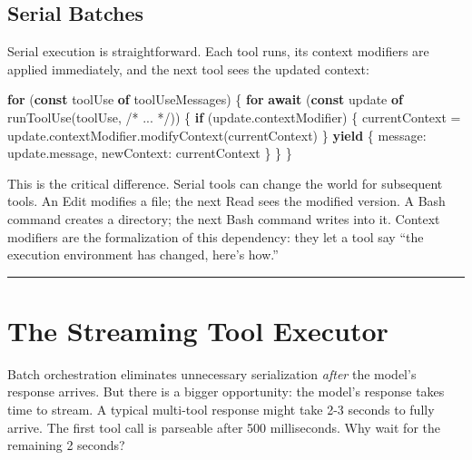 \documentclass[
  english,
  11pt,
  letterpaper,
]{book}
\newenvironment{Shaded}{\begin{snugshade}}{\end{snugshade}}
\newcommand{\AttributeTok}[1]{\textcolor[rgb]{0.40,0.45,0.13}{#1}}
\newcommand{\CommentTok}[1]{\textcolor[rgb]{0.37,0.37,0.37}{#1}}
\newcommand{\ControlFlowTok}[1]{\textcolor[rgb]{0.00,0.23,0.31}{\textbf{#1}}}
\newcommand{\FunctionTok}[1]{\textcolor[rgb]{0.28,0.35,0.67}{#1}}
\newcommand{\KeywordTok}[1]{\textcolor[rgb]{0.00,0.23,0.31}{\textbf{#1}}}
\newcommand{\NormalTok}[1]{\textcolor[rgb]{0.00,0.23,0.31}{#1}}
\newcommand{\OperatorTok}[1]{\textcolor[rgb]{0.37,0.37,0.37}{#1}}
\begin{document}
\subsection{Serial Batches}\label{serial-batches}

Serial execution is straightforward. Each tool runs, its context
modifiers are applied immediately, and the next tool sees the updated
context:

\begin{Shaded}
\begin{Highlighting}[]
\ControlFlowTok{for}\NormalTok{ (}\KeywordTok{const}\NormalTok{ toolUse }\KeywordTok{of}\NormalTok{ toolUseMessages) \{}
  \ControlFlowTok{for} \ControlFlowTok{await}\NormalTok{ (}\KeywordTok{const}\NormalTok{ update }\KeywordTok{of} \FunctionTok{runToolUse}\NormalTok{(toolUse}\OperatorTok{,} \CommentTok{/* ... */}\NormalTok{)) \{}
    \ControlFlowTok{if}\NormalTok{ (update}\OperatorTok{.}\AttributeTok{contextModifier}\NormalTok{) \{}
\NormalTok{      currentContext }\OperatorTok{=}\NormalTok{ update}\OperatorTok{.}\AttributeTok{contextModifier}\OperatorTok{.}\FunctionTok{modifyContext}\NormalTok{(currentContext)}
\NormalTok{    \}}
    \KeywordTok{yield}\NormalTok{ \{ message}\OperatorTok{:}\NormalTok{ update}\OperatorTok{.}\AttributeTok{message}\OperatorTok{,}\NormalTok{ newContext}\OperatorTok{:}\NormalTok{ currentContext \}}
\NormalTok{  \}}
\NormalTok{\}}
\end{Highlighting}
\end{Shaded}

This is the critical difference. Serial tools can change the world for
subsequent tools. An Edit modifies a file; the next Read sees the
modified version. A Bash command creates a directory; the next Bash
command writes into it. Context modifiers are the formalization of this
dependency: they let a tool say ``the execution environment has changed,
here's how.''

\begin{center}\rule{0.5\linewidth}{0.5pt}\end{center}

\section{The Streaming Tool Executor}\label{the-streaming-tool-executor}

Batch orchestration eliminates unnecessary serialization \emph{after}
the model's response arrives. But there is a bigger opportunity: the
model's response takes time to stream. A typical multi-tool response
might take 2-3 seconds to fully arrive. The first tool call is parseable
after 500 milliseconds. Why wait for the remaining 2 seconds?
\end{document}
